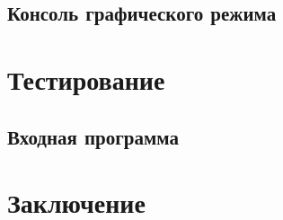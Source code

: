 \documentclass[12pt]{article}
\begin{document}
		\subsection{Консоль графического режима}
	\newpage
	\section{Тестирование}
		\subsection{Входная программа}
	\newpage	
	\section{Заключение}
	\newpage
	\nocite{*}
			
	
	
	\newpage
	\tableofcontents %

\end{document}
